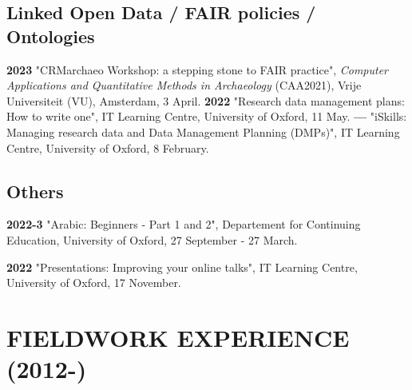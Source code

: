 \documentclass{article}
\begin{document}
\subsection*{Linked Open Data / FAIR policies / Ontologies}

\textbf{2023 }"CRMarchaeo Workshop: a stepping stone to FAIR practice", \textit{Computer Applications and Quantitative Methods in Archaeology} (CAA2021), Vrije Universiteit (VU), Amsterdam, 3 April.
\smallbreak
\textbf{2022 }"Research data management plans: How to write one", IT Learning Centre, University of Oxford, 11 May.
\smallbreak
\textbf{--- }"iSkills: Managing research data and Data Management Planning (DMPs)", IT Learning Centre, University of Oxford, 8 February.

\subsection*{Others}

\textbf{2022-3 }"Arabic: Beginners - Part 1 and 2", Departement for Continuing Education, University of Oxford, 27 September - 27 March.
\smallbreak

\textbf{2022 }"Presentations: Improving your online talks", IT Learning Centre, University of Oxford, 17 November.
\smallbreak

\section{FIELDWORK EXPERIENCE (2012-)}
\end{document}
